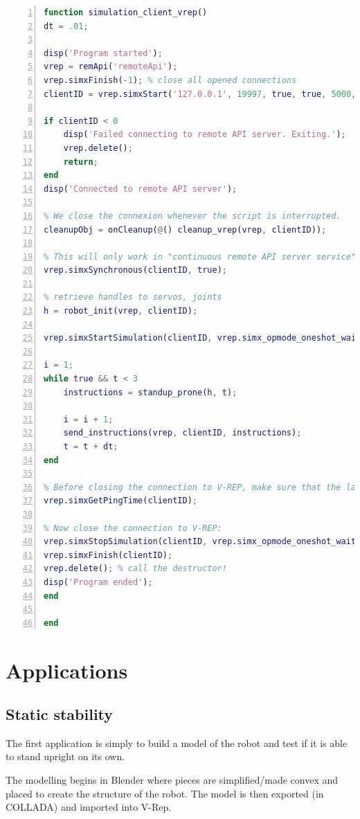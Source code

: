 \begin{lstlisting}[language=MATLAB, tabsize = 4, float, caption=Basic control program in MATLAB, captionpos = b, frame=leftline, keywordstyle=\color{blue}, numbers = left, commentstyle= \color{mygreen}]
function simulation_client_vrep()
dt = .01;

disp('Program started');
vrep = remApi('remoteApi');
vrep.simxFinish(-1); % close all opened connections
clientID = vrep.simxStart('127.0.0.1', 19997, true, true, 5000, 5);

if clientID < 0
    disp('Failed connecting to remote API server. Exiting.');
    vrep.delete();
    return;
end
disp('Connected to remote API server');

% We close the connexion whenever the script is interrupted.
cleanupObj = onCleanup(@() cleanup_vrep(vrep, clientID));

% This will only work in "continuous remote API server service"
vrep.simxSynchronous(clientID, true);

% retrieve handles to servos, joints
h = robot_init(vrep, clientID);

vrep.simxStartSimulation(clientID, vrep.simx_opmode_oneshot_wait);

i = 1;
while true && t < 3
    instructions = standup_prone(h, t);
    
    i = i + 1;
    send_instructions(vrep, clientID, instructions);
    t = t + dt;
end

% Before closing the connection to V-REP, make sure that the last command sent out had time to arrive.
vrep.simxGetPingTime(clientID);

% Now close the connection to V-REP:
vrep.simxStopSimulation(clientID, vrep.simx_opmode_oneshot_wait);
vrep.simxFinish(clientID);
vrep.delete(); % call the destructor!
disp('Program ended');
end

end
\end{lstlisting}

\section{Applications}
\subsection{Static stability}
The first application is simply to build a model of the robot and test if it is able to stand upright on its own.

The modelling begins in Blender where pieces are simplified/made convex and placed to create the structure of the robot. The model is then exported (in COLLADA) and imported into V-Rep. 

